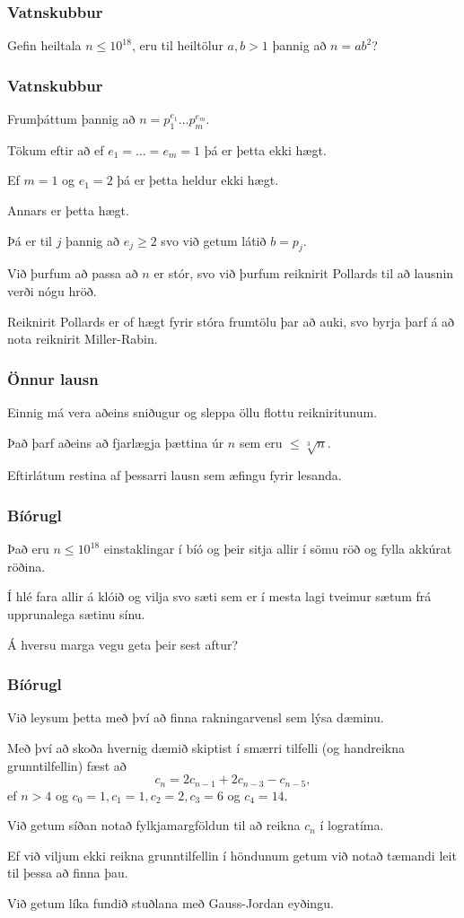 {
	\frametitle{Vatnskubbur}
	{
		\item<1-> Gefin heiltala $n \leq 10^{18}$, eru til heiltölur $a, b > 1$ þannig að $n = ab^2$?
	}
}

{
	\frametitle{Vatnskubbur}
	{
		\item<1-> Frumþáttum þannig að $n = p_1^{e_1} \dots p_m^{e_m}$.
		\item<2-> Tökum eftir að ef $e_1 = \dots = e_m = 1$ þá er þetta ekki hægt.
		\item<3-> Ef $m = 1$ og $e_1 = 2$ þá er þetta heldur ekki hægt.
		\item<4-> Annars er þetta hægt.
		\item<5-> Þá er til $j$ þannig að $e_j \geq 2$ svo við getum látið $b = p_j$.
		\item<6-> Við þurfum að passa að $n$ er stór, svo við þurfum reiknirit Pollards til að lausnin verði nógu hröð.
        \item<7-> Reiknirit Pollards er of hægt fyrir stóra frumtölu þar að auki, svo byrja þarf á að nota reiknirit Miller-Rabin.
	}
}

{
    \frametitle{Önnur lausn}
    {
        \item<1-> Einnig má vera aðeins sniðugur og sleppa öllu flottu reikniritunum.
        \item<2-> Það þarf aðeins að fjarlægja þættina úr $n$ sem eru $\leq \sqrt[3]{n}$.
        \item<3-> Eftirlátum restina af þessarri lausn sem æfingu fyrir lesanda.
    }
}

{
	\frametitle{Bíórugl}
	{
		\item<1-> Það eru $n \leq 10^{18}$ einstaklingar í bíó og þeir sitja allir í sömu röð og fylla akkúrat röðina.
		\item<2-> Í hlé fara allir á klóið og vilja svo sæti sem er í mesta lagi tveimur sætum frá upprunalega sætinu sínu.
		\item<3-> Á hversu marga vegu geta þeir sest aftur?
	}
}

{
	\frametitle{Bíórugl}
	{
		\item<1-> Við leysum þetta með því að finna rakningarvensl sem lýsa dæminu.
		\item<2-> Með því að skoða hvernig dæmið skiptist í smærri tilfelli (og handreikna grunntilfellin) fæst að
		\[
			c_n = 2c_{n - 1} + 2c_{n - 3} - c_{n - 5},
		\]
		ef $n > 4$ og $c_0 = 1, c_1 = 1, c_2 = 2, c_3 = 6$ og $c_4 = 14$.
		\item<3-> Við getum síðan notað fylkjamargföldun til að reikna $c_n$ í logratíma.
		\item<4-> Ef við viljum ekki reikna grunntilfellin í höndunum getum við notað tæmandi leit til þessa að finna þau.
		\item<5-> Við getum líka fundið stuðlana með Gauss-Jordan eyðingu.
	}
}

